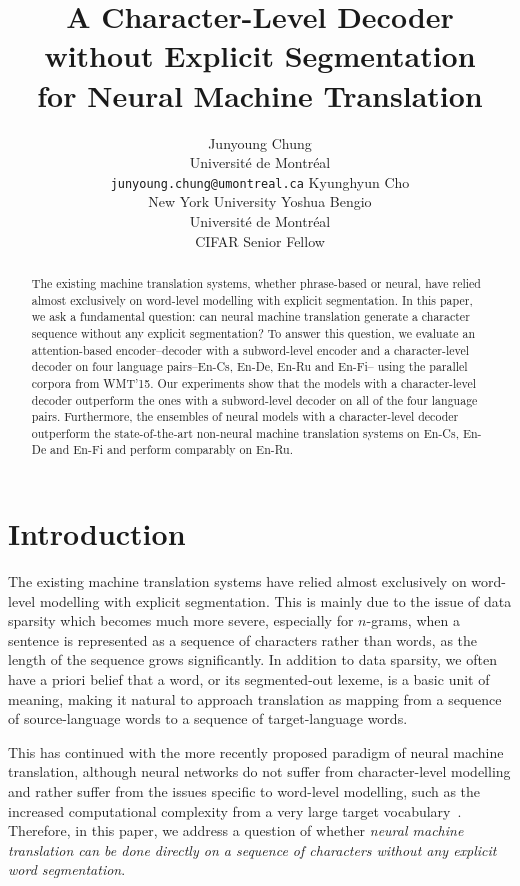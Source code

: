 \documentclass[11pt]{article}
\title{A Character-Level Decoder without Explicit Segmentation\\ 
       for Neural Machine Translation}
\author{Junyoung Chung \\
Universit\'e de Montr\'eal \\
        {\small \texttt{junyoung.chung@umontreal.ca}}
	  \And
	Kyunghyun Cho \\
    New York University 
	  \And
	Yoshua Bengio \\
Universit\'e de Montr\'eal \\
    CIFAR Senior Fellow
  }
\date{}
\begin{document}
\maketitle
\vspace*{-7mm}
\begin{abstract}
    The existing machine translation systems, whether phrase-based or neural,
    have relied almost exclusively on word-level modelling with explicit
    segmentation. In this paper, we ask a fundamental question: can neural
    machine translation generate a character sequence without any explicit
    segmentation? To answer this question, we evaluate an
    attention-based encoder--decoder with a subword-level encoder and a
    character-level decoder on four language pairs--En-Cs, En-De, En-Ru and
    En-Fi-- using the parallel corpora from WMT'15. Our experiments show that
    the models with a character-level decoder outperform the ones with a
    subword-level decoder on all of the four language pairs.
    Furthermore, the ensembles of neural models with a character-level
    decoder outperform the state-of-the-art non-neural machine translation
    systems on En-Cs, En-De and En-Fi and perform comparably on En-Ru.
\end{abstract}

\vspace*{-3mm}
\section{Introduction}
\label{sec:intro}
\vspace*{-2mm}

The existing machine translation systems have relied almost exclusively on
word-level modelling with explicit segmentation. This is mainly due to the issue
of data sparsity which becomes much more severe, especially for $n$-grams, when a sentence is represented
as a sequence of characters rather than words, as the length of the sequence
grows significantly. In addition to data sparsity, we often have a priori belief
that a word, or its segmented-out lexeme, is a basic unit of meaning, making it
natural to approach translation as mapping from a sequence of source-language words to a
sequence of target-language words.

This has continued with the more recently proposed paradigm of neural machine
translation, although neural networks do not suffer from character-level
modelling and rather suffer from the issues specific to word-level modelling,
such as the increased computational complexity from a very large target
vocabulary~\cite{jean2014using,luong2014addressing}.
Therefore, in this paper,
we address a question of whether {\em neural machine translation can be done
directly on a sequence of characters without any explicit word
segmentation}. 
\end{document}
